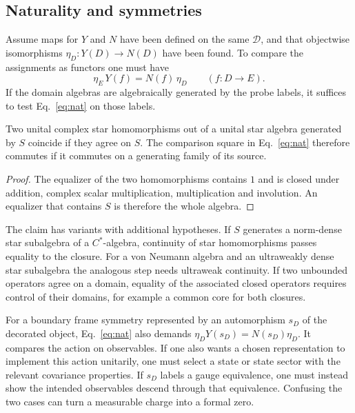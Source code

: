 \documentclass[11pt,letterpaper]{article}
\newcommand{\Dcat}{\mathcal D}
\begin{document}
\subsection{Naturality and symmetries}

Assume maps for $Y$ and $N$ have been defined on the same $\Dcat$, and that objectwise isomorphisms $\eta_D:Y(D)\to N(D)$ have been found. To compare the assignments as functors one must have
\begin{equation}
 \eta_E\,Y(f)=N(f)\,\eta_D\qquad (f:D\to E).            \label{eq:nat}
\end{equation}
If the domain algebras are algebraically generated by the probe labels, it suffices to test Eq.~\eqref{eq:nat} on those labels.

\begin{lemma}\label{lem:generator}
Two unital complex star homomorphisms out of a unital star algebra generated by $S$ coincide if they agree on $S$. The comparison square in Eq.~\eqref{eq:nat} therefore commutes if it commutes on a generating family of its source.
\end{lemma}
\begin{proof}
The equalizer of the two homomorphisms contains $1$ and is closed under addition, complex scalar multiplication, multiplication and involution. An equalizer that contains $S$ is therefore the whole algebra.
\end{proof}

The claim has variants with additional hypotheses. If $S$ generates a norm-dense star subalgebra of a $C^*$-algebra, continuity of star homomorphisms passes equality to the closure. For a von Neumann algebra and an ultraweakly dense star subalgebra the analogous step needs ultraweak continuity. If two unbounded operators agree on a domain, equality of the associated closed operators requires control of their domains, for example a common core for both closures.

For a boundary frame symmetry represented by an automorphism $s_D$ of the decorated object, Eq.~\eqref{eq:nat} also demands $\eta_DY(s_D)=N(s_D)\eta_D$. It compares the action on observables. If one also wants a chosen representation to implement this action unitarily, one must select a state or state sector with the relevant covariance properties. If $s_D$ labels a gauge equivalence, one must instead show the intended observables descend through that equivalence. Confusing the two cases can turn a measurable charge into a formal zero.
\end{document}
